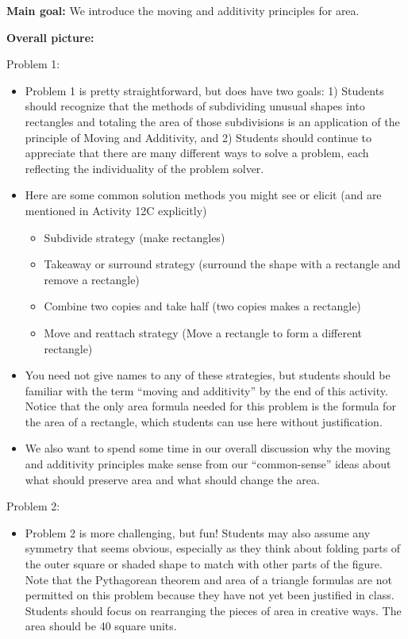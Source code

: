 \documentclass[noauthor,nooutcomes, handout]{ximera}
\begin{document}
\begin{instructorNotes}
{\bf Main goal:} We introduce the moving and additivity principles for area.

{\bf Overall picture:} 

Problem 1:
\begin{itemize}
\item Problem 1 is pretty straightforward, but does have two goals: 1) Students should recognize that the methods of subdividing unusual shapes into rectangles and totaling the area of those subdivisions is an application of the principle of Moving and Additivity, and 2) Students should continue to appreciate that there are many different ways to solve a problem, each reflecting the individuality of the problem solver.

\item Here are some common solution methods you might see or elicit (and are mentioned in Activity 12C explicitly)
\begin{itemize}
    \item Subdivide strategy (make rectangles)
    \item Takeaway or surround strategy (surround the shape with a rectangle and remove a rectangle)
    \item Combine two copies and take half (two copies makes a rectangle)
    \item Move and reattach strategy (Move a rectangle to form a different rectangle)
\end{itemize}

\item You need not give names to any of these strategies, but students should be familiar with the term ``moving and additivity'' by the end of this activity.  Notice that the only area formula needed for this problem is the formula for the area of a rectangle, which students can use here without justification.
\item We also want to spend some time in our overall discussion why the moving and additivity principles make sense from our ``common-sense'' ideas about what should preserve area and what should change the area.
\end{itemize}

Problem 2:
\begin{itemize}
\item Problem 2 is more challenging, but fun!   Students may also assume any symmetry that seems obvious, especially as they think about folding parts of the outer square or shaded shape to match with other parts of the figure. Note that the Pythagorean theorem and area of a triangle formulas are not permitted on this problem because they have not yet been justified in class. Students should focus on rearranging the pieces of area in creative ways. The area should be 40 square units.
\end{itemize}



\end{instructorNotes}
\end{document}
